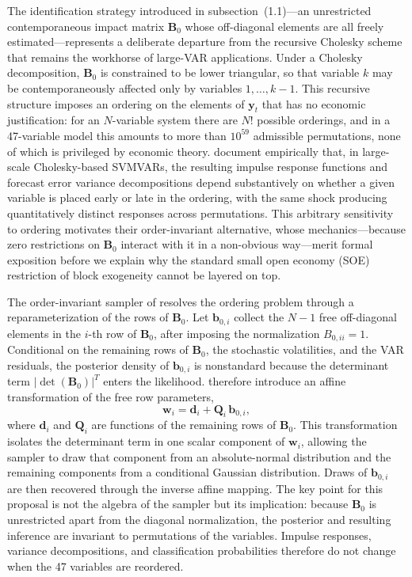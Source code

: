The identification strategy introduced in subsection~(1.1)---an unrestricted contemporaneous impact matrix $\mathbf{B}_0$ whose off-diagonal elements are all freely estimated---represents a deliberate departure from the recursive Cholesky scheme that remains the workhorse of large-VAR applications. Under a Cholesky decomposition, $\mathbf{B}_0$ is constrained to be lower triangular, so that variable $k$ may be contemporaneously affected only by variables $1, \ldots, k-1$. This recursive structure imposes an ordering on the elements of $\mathbf{y}_t$ that has no economic justification: for an $N$-variable system there are $N!$ possible orderings, and in a 47-variable model this amounts to more than $10^{59}$ admissible permutations, none of which is privileged by economic theory. \citet{davidson2025investigating} document empirically that, in large-scale Cholesky-based SVMVARs, the resulting impulse response functions and forecast error variance decompositions depend substantively on whether a given variable is placed early or late in the ordering, with the same shock producing quantitatively distinct responses across permutations. This arbitrary sensitivity to ordering motivates their order-invariant alternative, whose mechanics---because zero restrictions on $\mathbf{B}_0$ interact with it in a non-obvious way---merit formal exposition before we explain why the standard small open economy (SOE) restriction of block exogeneity cannot be layered on top.

The order-invariant sampler of \citet{davidson2025investigating} resolves the ordering problem through a reparameterization of the rows of $\mathbf{B}_0$. Let $\mathbf{b}_{0,i}$ collect the $N-1$ free off-diagonal elements in the $i$-th row of $\mathbf{B}_0$, after imposing the normalization $B_{0,ii}=1$. Conditional on the remaining rows of $\mathbf{B}_0$, the stochastic volatilities, and the VAR residuals, the posterior density of $\mathbf{b}_{0,i}$ is nonstandard because the determinant term $|\det(\mathbf{B}_0)|^T$ enters the likelihood. \citet{davidson2025investigating} therefore introduce an affine transformation of the free row parameters,
%
\begin{equation}
\mathbf{w}_i = \mathbf{d}_i + \mathbf{Q}_i\, \mathbf{b}_{0,i},
\label{eq:Qtransform}
\end{equation}
%
where $\mathbf{d}_i$ and $\mathbf{Q}_i$ are functions of the remaining rows of $\mathbf{B}_0$. This transformation isolates the determinant term in one scalar component of $\mathbf{w}_i$, allowing the sampler to draw that component from an absolute-normal distribution and the remaining components from a conditional Gaussian distribution. Draws of $\mathbf{b}_{0,i}$ are then recovered through the inverse affine mapping. The key point for this proposal is not the algebra of the sampler but its implication: because $\mathbf{B}_0$ is unrestricted apart from the diagonal normalization, the posterior and resulting inference are invariant to permutations of the variables. Impulse responses, variance decompositions, and classification probabilities therefore do not change when the 47 variables are reordered.


